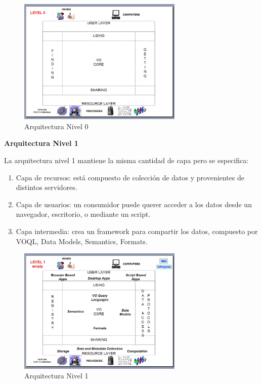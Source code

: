 \begin{figure}
    \centering
    \includegraphics[width=0.7\textwidth]{img/arquitectura_0.png}
    \caption{Arquitectura Nivel 0}
    \label{fig:nivel0}
\end{figure}

\textbf{Arquitectura Nivel 1}%


La arquitectura nivel 1 mantiene la misma cantidad de capa pero se especifica:
\begin{enumerate}
    \item Capa de recursos:
          está compuesto de colección de datos y provenientes de distintos
          servidores.
    \item Capa de usuarios:
          un consumidor puede querer acceder a los datos desde un navegador,
          escritorio, o mediante un script.
    \item Capa intermedia:
          crea un framework para compartir los datos, compuesto por VOQL,
          Data Models, Semantics, Formats.
\end{enumerate}

\begin{figure}
    \centering
    \includegraphics[width=0.7\textwidth]{img/arquitectura_1.png}
    \caption{Arquitectura Nivel 1}
    \label{fig:nivel1}
\end{figure}

